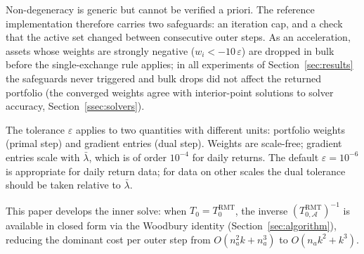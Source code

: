 \begin{remark}\label{rem:safeguards}
Non-degeneracy is generic but cannot be verified a priori. The reference
implementation therefore carries two safeguards: an iteration cap, and a check
that the active set changed between consecutive outer steps. As an
acceleration, assets whose weights are strongly negative
($w_i < -10\,\varepsilon$) are dropped in bulk before the single-exchange rule
applies; in all experiments of Section~\ref{sec:results} the safeguards never
triggered and bulk drops did not affect the returned portfolio (the converged
weights agree with interior-point solutions to solver accuracy,
Section~\ref{ssec:solvers}).
\end{remark}

\begin{remark}\label{rem:tolerance}
The tolerance $\varepsilon$ applies to two quantities with different units:
portfolio weights (primal step) and gradient entries (dual step). Weights are
scale-free; gradient entries scale with $\bar\lambda$, which is of order
$10^{-4}$ for daily returns. The default $\varepsilon = 10^{-6}$ is appropriate
for daily return data; for data on other scales the dual tolerance should be
taken relative to $\bar\lambda$.
\end{remark}

This paper develops the inner solve: when $T_0 = T_0^{\mathrm{RMT}}$, the
inverse $(T_{0,\mathcal{A}}^{\mathrm{RMT}})^{-1}$ is available in closed form
via the Woodbury identity (Section~\ref{sec:algorithm}), reducing the dominant
cost per outer step from $O(n_a^2 k + n_a^3)$ to $O(n_a k^2 + k^3)$.
